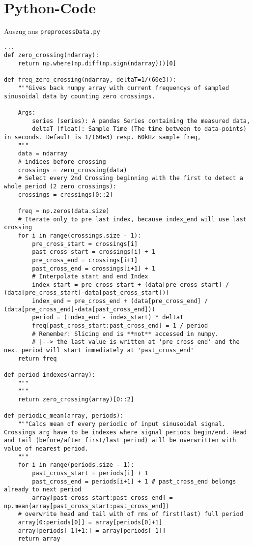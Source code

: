 \section{Python-Code}
\label{sec:PythonCode}

\begingroup
\captionsetup{type=listing}
\caption{Auszug aus \texttt{preprocessData.py}\label{lst:PreprocessData}}
\begin{verbatim}
...
def zero_crossing(ndarray):
    return np.where(np.diff(np.sign(ndarray)))[0]

def freq_zero_crossing(ndarray, deltaT=1/(60e3)):
    """Gives back numpy array with current frequencys of sampled sinusoidal data by counting zero crossings.
    
    Args:
        series (series): A pandas Series containing the measured data,
        deltaT (float): Sample Time (The time between to data-points) in seconds. Default is 1/(60e3) resp. 60kHz sample freq,
    """
    data = ndarray
    # indices before crossing
    crossings = zero_crossing(data)
    # Select every 2nd Crossing beginning with the first to detect a whole period (2 zero crossings):
    crossings = crossings[0::2]
    
    freq = np.zeros(data.size)
    # Iterate only to pre last index, because index_end will use last crossing
    for i in range(crossings.size - 1):
        pre_cross_start = crossings[i]
        past_cross_start = crossings[i] + 1
        pre_cross_end = crossings[i+1]
        past_cross_end = crossings[i+1] + 1
        # Interpolate start and end Index
        index_start = pre_cross_start + (data[pre_cross_start] / (data[pre_cross_start]-data[past_cross_start]))
        index_end = pre_cross_end + (data[pre_cross_end] / (data[pre_cross_end]-data[past_cross_end]))
        period = (index_end - index_start) * deltaT 
        freq[past_cross_start:past_cross_end] = 1 / period 
        # Remember: Slicing end is **not** accessed in numpy. 
        # |--> the last value is written at 'pre_cross_end' and the next period will start immediately at 'past_cross_end'
    return freq

def period_indexes(array):
    """
    """
    return zero_crossing(array)[0::2]

def periodic_mean(array, periods):
    """Calcs mean of every periodic of input sinusoidal signal. Crossings arg have to be indexes where signal periods begin/end. Head and tail (before/after first/last period) will be overwritten with value of nearest period.
    """
    for i in range(periods.size - 1):
        past_cross_start = periods[i] + 1
        past_cross_end = periods[i+1] + 1 # past_cross_end belongs already to next period
        array[past_cross_start:past_cross_end] = np.mean(array[past_cross_start:past_cross_end])
    # overwrite head and tail with of rms of first(last) full period
    array[0:periods[0]] = array[periods[0]+1]
    array[periods[-1]+1:] = array[periods[-1]]
    return array


\end{verbatim}
